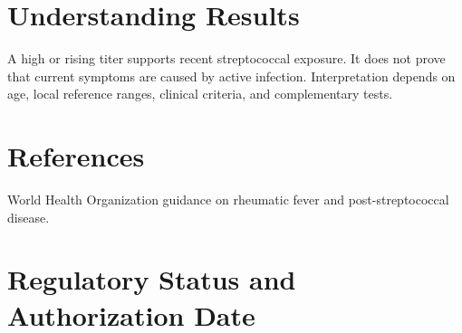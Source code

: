 \section*{Understanding Results}
A high or rising titer supports recent streptococcal exposure. It does not prove that current symptoms are caused by active infection. Interpretation depends on age, local reference ranges, clinical criteria, and complementary tests.

\section*{References}
World Health Organization guidance on rheumatic fever and post-streptococcal disease.

\clearpage


\section*{Regulatory Status and Authorization Date}

\clearpage
